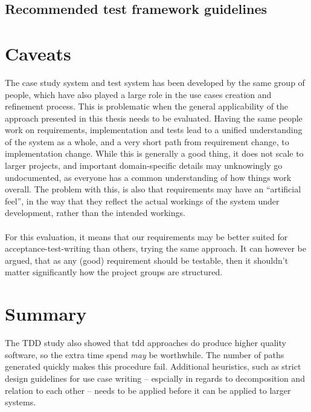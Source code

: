 \subsection{Recommended test framework guidelines}

\section{Caveats}
The case study system and test system has been developed by the same group of people, which have also played a large role in the use cases creation and refinement process. This is problematic when the general applicability of the approach presented in this thesis needs to be evaluated. Having the same people work on requirements, implementation and tests lead to a unified understanding of the system as a whole, and a very short path from requirement change, to implementation change. While this is generally a good thing, it does not scale to larger projects, and important domain-specific details may unknowingly go undocumented, as everyone has a common understanding of how things work overall. The problem with this, is also that requirements may have an ``artificial feel'', in the way that they reflect the actual workings of the system under development, rather than the intended workings.\\\\
For this evaluation, it means that our requirements may be better suited for acceptance-test-writing than others, trying the same approach. It can however be argued, that as any (good) requirement should be testable\cite{hull2010requirements}, then it shouldn't matter significantly how the project groups are structured.

\section{Summary}
The TDD study also showed that tdd approaches do produce higher quality software, so the extra time spend \emph{may} be worthwhile.
The number of paths generated quickly makes this procedure fail. Additional heuristics, such as strict design guidelines for use case writing -- espcially in regards to decomposition and relation to each other -- needs to be applied before it can be applied to larger systems.